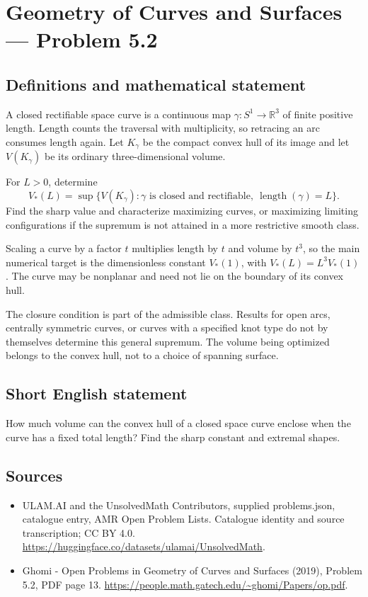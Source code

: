 \documentclass[11pt,a4paper]{article}
\begin{document}
\section*{Geometry of Curves and Surfaces — Problem 5.2}\label{statement}

\subsection{Definitions and mathematical statement}
A closed rectifiable space curve is a continuous map
$\gamma:S^1\to\mathbb R^3$ of finite positive length. Length
counts the traversal with multiplicity, so retracing an arc
consumes length again. Let $K_\gamma$ be the compact convex hull
of its image and let $V(K_\gamma)$ be its ordinary
three-dimensional volume.

For $L>0$, determine
\[
 V_*(L)=\sup\{V(K_\gamma):\gamma\text{ is closed and rectifiable},
                              \ \operatorname{length}(\gamma)=L\}.
\]
Find the sharp value and characterize maximizing curves, or
maximizing limiting configurations if the supremum is not
attained in a more restrictive smooth class.

Scaling a curve by a factor $t$ multiplies length by $t$ and
volume by $t^3$, so the main numerical target is the dimensionless
constant $V_*(1)$, with $V_*(L)=L^3V_*(1)$. The curve may be
nonplanar and need not lie on the boundary of its convex hull.

The closure condition is part of the admissible class. Results
for open arcs, centrally symmetric curves, or curves with a
specified knot type do not by themselves determine this general
supremum. The volume being optimized belongs to the convex hull,
not to a choice of spanning surface.
\subsection{Short English statement}
How much volume can the convex hull of a closed space curve enclose
when the curve has a fixed total length? Find the sharp constant
and extremal shapes.
\subsection{Sources}
\begin{itemize}
\item[S1] ULAM.AI and the UnsolvedMath Contributors, supplied problems.json, catalogue entry, AMR Open Problem Lists. Catalogue identity and source transcription; CC BY 4.0.
\url{https://huggingface.co/datasets/ulamai/UnsolvedMath}.
\item[S2] Ghomi - Open Problems in Geometry of Curves and Surfaces (2019), Problem 5.2, PDF page 13. 
\url{https://people.math.gatech.edu/~ghomi/Papers/op.pdf}.
\end{itemize}
\end{document}
